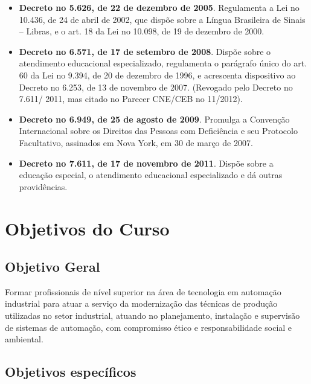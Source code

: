 \begin{itemize}
\item \textbf{Decreto no 5.626, de 22 de dezembro de 2005}. Regulamenta a Lei no 10.436, de 24 de abril de 2002, que dispõe sobre a Língua Brasileira de Sinais – Libras, e o art. 18 da Lei no 10.098, de 19 de dezembro de 2000.

\item \textbf{Decreto no 6.571, de 17 de setembro de 2008}. Dispõe sobre o atendimento
educacional especializado, regulamenta o parágrafo único do art. 60 da Lei no 9.394, de 20 de dezembro de 1996, e acrescenta dispositivo ao Decreto no 6.253, de 13 de novembro de 2007. (Revogado pelo Decreto no 7.611/ 2011, mas citado no Parecer CNE/CEB no 11/2012).

\item \textbf{Decreto no 6.949, de 25 de agosto de 2009}. Promulga a Convenção Internacional sobre os Direitos das Pessoas com Deficiência e seu Protocolo Facultativo, assinados em Nova York, em 30 de março de 2007.

\item \textbf{Decreto no 7.611, de 17 de novembro de 2011}. Dispõe sobre a educação especial, o atendimento educacional especializado e dá outras providências.

\end{itemize}

\chapter{Objetivos do Curso}

\section{Objetivo Geral}
Formar profissionais de nível superior na área de tecnologia em automação industrial para atuar a serviço da modernização das técnicas de produção utilizadas no setor industrial, atuando no planejamento, instalação e supervisão de sistemas de automação, com compromisso ético e responsabilidade social e ambiental.

\section{Objetivos específicos}

